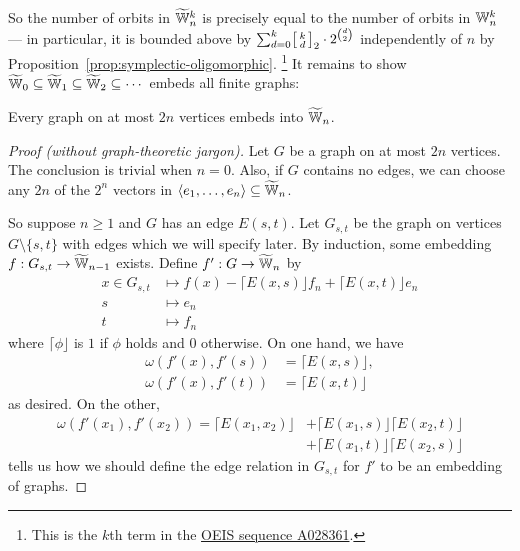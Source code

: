 So the number of orbits in $\widetilde {\mathbb{W}}_n^k$ is precisely equal to the number of orbits in $\mathbb{W}_n^k$
--- in particular, it is bounded above by $\sum_{d=0}^k \begin{bsmallmatrix}k \\ d\end{bsmallmatrix}_2 \cdot 2^{\binom{d}{2}}$ independently of $n$ by Proposition~\ref{prop:symplectic-oligomorphic}.%
\footnote{This is the $k$th term in the \href{https://oeis.org/A028361}{OEIS sequence A028361}.}
It remains to show $\widetilde {\mathbb{W}}_0 \subseteq \widetilde {\mathbb{W}}_1 \subseteq \widetilde {\mathbb{W}}_2 \subseteq \cdots$ embeds all finite graphs:

\begin{proposition}[{\cite[Thm.~8.11.2]{GR01}}]
    Every graph on at most $2n$ vertices embeds into $\widetilde {\mathbb{W}}_n$.
\end{proposition}
\begin{proof}[Proof (without graph-theoretic jargon)]

    Let $G$ be a graph on at most $2n$ vertices. 
    The conclusion is trivial when $n = 0$.
    Also, if $G$ contains no edges, we can choose any $2n$ of the $2^n$ vectors in 
    $\langle e_1, \ldots, e_n \rangle \subseteq \widetilde {\mathbb{W}}_n$.
    
    So suppose $n \geq 1$ and $G$ has an edge $E(s, t)$.
    Let $G_{s,t}$ be the graph on vertices $G \setminus \{s, t\}$ with edges which we will specify later.
    By induction, some embedding $f : G_{s, t} \to \widetilde {\mathbb{W}}_{n-1}$ exists.
    Define $f' : G \to \widetilde {\mathbb{W}}_n$ by
    \begin{align*}
        x \in G_{s, t} &\mapsto f(x) - \lceil E(x, s) \rfloor f_n + \lceil E(x, t) \rfloor e_n \\
        s &\mapsto e_n \\
        t &\mapsto f_n
    \end{align*}
    where $\lceil \phi \rfloor$ is $1$ if $\phi$ holds and $0$ otherwise.
    On one hand, we have
    \begin{align*}
        \omega(f'(x), f'(s)) &= \lceil E(x, s) \rfloor, \\
        \omega(f'(x), f'(t)) &= \lceil E(x, t) \rfloor
    \end{align*}
    as desired.
    On the other,
    \begin{align*}
        \omega( f'(x_1), f'(x_2) ) 
        = \lceil E(x_1, x_2) \rfloor 
        &+ \lceil E(x_1, s) \rfloor \lceil E(x_2, t) \rfloor \\
        &+ \lceil E(x_1, t) \rfloor \lceil E(x_2, s) \rfloor
    \end{align*}
    tells us how we should define the edge relation in $G_{s,t}$ for $f'$ to be an embedding of graphs.
\end{proof}

